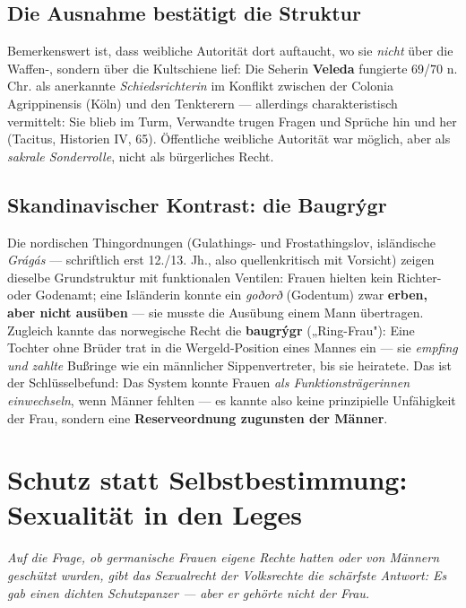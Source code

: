 \documentclass[11pt,a4paper,ngerman]{scrartcl}
\newcommand{\chipbase}[2]{\hspace{0pt}{\footnotesize\textcolor{#1}{[\textsc{#2}]}}}
\newcommand{\chipbelegt}[1]{\chipbase{chipgreen}{#1}}
\newcommand{\chipplausibel}[1]{\chipbase{chipamber}{#1}}
\begin{document}
\subsection*{Die Ausnahme bestätigt die Struktur}

Bemerkenswert ist, dass weibliche Autorität dort auftaucht, wo sie \emph{nicht} über die Waffen-, sondern über die Kultschiene lief: Die Seherin \textbf{Veleda} fungierte 69/70 n. Chr. als anerkannte \emph{Schiedsrichterin} im Konflikt zwischen der Colonia Agrippinensis (Köln) und den Tenkterern — allerdings charakteristisch vermittelt: Sie blieb im Turm, Verwandte trugen Fragen und Sprüche hin und her (Tacitus, Historien IV, 65). Öffentliche weibliche Autorität war möglich, aber als \emph{sakrale Sonderrolle}, nicht als bürgerliches Recht. \chipbelegt{belegt}

\subsection*{Skandinavischer Kontrast: die Baugrýgr}

Die nordischen Thingordnungen (Gulathings- und Frostathingslov, isländische \emph{Grágás} — schriftlich erst 12./13. Jh., also quellenkritisch mit Vorsicht) zeigen dieselbe Grundstruktur mit funktionalen Ventilen: Frauen hielten kein Richter- oder Godenamt; eine Isländerin konnte ein \emph{goðorð} (Godentum) zwar \textbf{erben, aber nicht ausüben} — sie musste die Ausübung einem Mann übertragen. Zugleich kannte das norwegische Recht die \textbf{baugrýgr} („Ring-Frau"): Eine Tochter ohne Brüder trat in die Wergeld-Position eines Mannes ein — sie \emph{empfing und zahlte} Bußringe wie ein männlicher Sippenvertreter, bis sie heiratete. \chipbelegt{belegt} Das ist der Schlüsselbefund: Das System konnte Frauen \emph{als Funktionsträgerinnen einwechseln}, wenn Männer fehlten — es kannte also keine prinzipielle Unfähigkeit der Frau, sondern eine \textbf{Reserveordnung zugunsten der Männer}. \chipplausibel{plausibel}


\section{Schutz statt Selbstbestimmung: Sexualität in den Leges}

\noindent\textit{Auf die Frage, ob germanische Frauen eigene Rechte hatten oder von Männern geschützt \emph{wurden}, gibt das Sexualrecht der Volksrechte die schärfste Antwort: Es gab einen dichten Schutzpanzer — aber er gehörte nicht der Frau.}
\medskip
\end{document}
